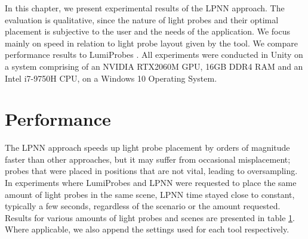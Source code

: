 In this chapter, we present experimental results of the LPNN approach. The evaluation is qualitative, since the nature of light probes and their optimal placement is subjective to the user and the needs of the application. We focus mainly on speed in relation to light probe layout given by the tool. We compare performance results to LumiProbes \parencite{Vardis2021}. All experiments were conducted in Unity on a system comprising of an NVIDIA RTX2060M GPU, 16GB DDR4 RAM and an Intel i7-9750H CPU, on a Windows 10 Operating System.

\section{Performance}
The LPNN approach speeds up light probe placement by orders of magnitude faster than other approaches, but it may suffer from occasional misplacement; probes that were placed in positions that are not vital, leading to oversampling. In experiments where LumiProbes and LPNN were requested to place the same amount of light probes in the same scene, LPNN time stayed close to constant, typically a few seconds, regardless of the scenario or the amount requested. Results for various amounts of light probes and scenes are presented in table \ref{}. Where applicable, we also append the settings used for each tool respectively.

